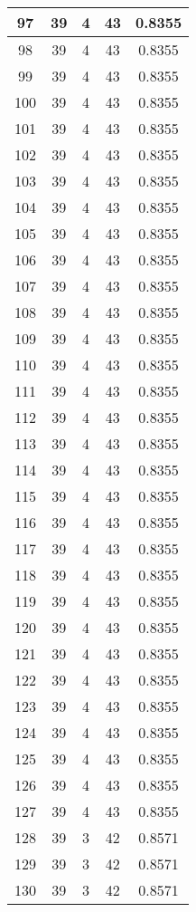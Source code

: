 \documentclass[letterpaper, 12pt]{article}
\begin{document}
\begin{longtable}{|c|c|c|c|c|}
\hline
97 & 39 & 4 & 43 & 0.8355 \\
\hline
98 & 39 & 4 & 43 & 0.8355 \\
\hline
99 & 39 & 4 & 43 & 0.8355 \\
\hline
100 & 39 & 4 & 43 & 0.8355 \\
\hline
101 & 39 & 4 & 43 & 0.8355 \\
\hline
102 & 39 & 4 & 43 & 0.8355 \\
\hline
103 & 39 & 4 & 43 & 0.8355 \\
\hline
104 & 39 & 4 & 43 & 0.8355 \\
\hline
105 & 39 & 4 & 43 & 0.8355 \\
\hline
106 & 39 & 4 & 43 & 0.8355 \\
\hline
107 & 39 & 4 & 43 & 0.8355 \\
\hline
108 & 39 & 4 & 43 & 0.8355 \\
\hline
109 & 39 & 4 & 43 & 0.8355 \\
\hline
110 & 39 & 4 & 43 & 0.8355 \\
\hline
111 & 39 & 4 & 43 & 0.8355 \\
\hline
112 & 39 & 4 & 43 & 0.8355 \\
\hline
113 & 39 & 4 & 43 & 0.8355 \\
\hline
114 & 39 & 4 & 43 & 0.8355 \\
\hline
115 & 39 & 4 & 43 & 0.8355 \\
\hline
116 & 39 & 4 & 43 & 0.8355 \\
\hline
117 & 39 & 4 & 43 & 0.8355 \\
\hline
118 & 39 & 4 & 43 & 0.8355 \\
\hline
119 & 39 & 4 & 43 & 0.8355 \\
\hline
120 & 39 & 4 & 43 & 0.8355 \\
\hline
121 & 39 & 4 & 43 & 0.8355 \\
\hline
122 & 39 & 4 & 43 & 0.8355 \\
\hline
123 & 39 & 4 & 43 & 0.8355 \\
\hline
124 & 39 & 4 & 43 & 0.8355 \\
\hline
125 & 39 & 4 & 43 & 0.8355 \\
\hline
126 & 39 & 4 & 43 & 0.8355 \\
\hline
127 & 39 & 4 & 43 & 0.8355 \\
\hline
128 & 39 & 3 & 42 & 0.8571 \\
\hline
129 & 39 & 3 & 42 & 0.8571 \\
\hline
130 & 39 & 3 & 42 & 0.8571 \\

\end{longtable}
\end{document}
